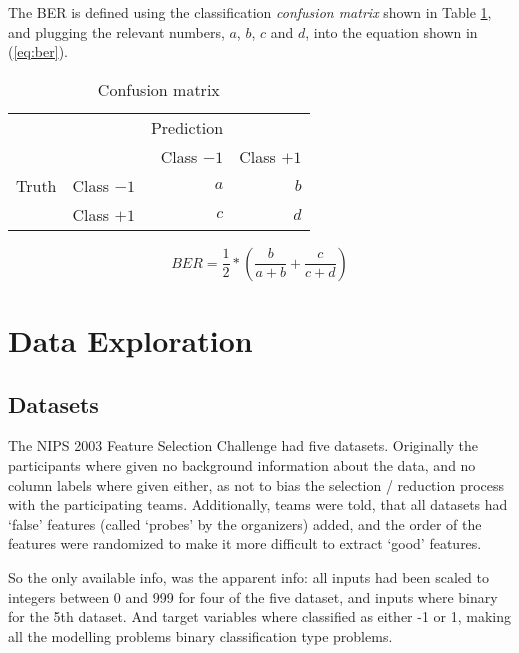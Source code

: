 \documentclass[12pt]{article}
\begin{document}
The BER is defined using the classification \emph{confusion matrix} shown in Table \ref{tab:confusionmat}, and plugging the relevant numbers, $a$, $b$, $c$ and $d$, into the equation shown in (\ref{eq:ber}).

\begin{table}[h]
\centering
\begin{tabular}{rrrr}
\toprule
{}		&			& Prediction	& \\
{}		&			& Class $-1$	& Class $+1$ \\
\midrule
Truth	& Class $-1$	& $a$		& $b$ \\
{}		& Class $+1$	& $c$		& $d$ \\
\bottomrule
\end{tabular}
\caption{\label{tab:confusionmat} Confusion matrix}
\end{table}

\begin{equation} \label{eq:ber}
BER = \frac{1}{2} * \left( \frac{b}{a+b} + \frac{c}{c+d} \right)
\end{equation}


\section{Data Exploration}

\subsection{Datasets}

The NIPS 2003 Feature Selection Challenge had five datasets. Originally the participants where given no background information about the data, and no column labels where given either, as not to bias the selection / reduction process with the participating teams. Additionally, teams were told, that all datasets had `false' features (called `probes' by the organizers) added, and the order of the features were randomized to make it more difficult to extract `good' features.

So the only available info, was the apparent info: all inputs had been scaled to integers between 0 and 999 for four of the five dataset, and inputs where binary for the 5th dataset. And target variables where classified as either -1 or 1, making all the modelling problems binary classification type problems.
\end{document}
